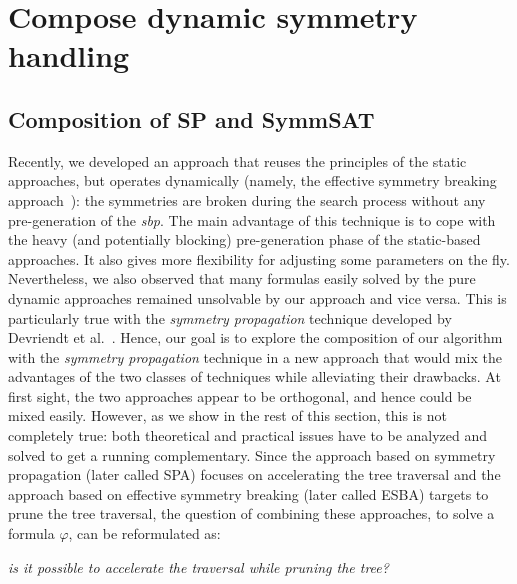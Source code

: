 \chapter{Compose dynamic symmetry handling}\label{chap:compose}
\minitoc
\section{Composition of SP and SymmSAT}
Recently, we developed an approach that reuses the
principles of the static approaches, but operates dynamically (namely, the effective symmetry breaking approach~\cite{metin2018cdclsym}):
 the symmetries are broken during the search process without any pre-generation of the \textit{sbp}. The main
advantage of this technique is to cope with the heavy (and potentially
blocking) pre-generation phase of the static-based approaches. It also gives
more flexibility for adjusting some parameters on the fly. 
Nevertheless, we also observed that many formulas easily solved by the pure
dynamic approaches remained unsolvable by our approach and vice versa. This is
particularly true with the \textit{symmetry propagation} technique developed by
Devriendt et al.~\cite{Devriendt12}.
Hence, our goal is to explore the composition of our algorithm with the  \textit{symmetry propagation} technique in
a new approach that would mix the advantages of the two classes of techniques while alleviating their drawbacks. At first sight,
the two approaches appear to be orthogonal, and hence could be mixed easily. However, as we show in the rest of this section,
this is not completely true: both theoretical and practical issues have to be analyzed and solved to get a
running complementary. 
Since the approach based on symmetry propagation (later called SPA) focuses on
accelerating the tree traversal and the approach based on effective symmetry
breaking (later called ESBA) targets to prune the tree traversal, the question of combining these approaches, to solve a formula $\varphi$, can
be reformulated as: 
\begin{center}
 \textit{is it possible to accelerate the traversal while pruning the tree?}
\end{center}
